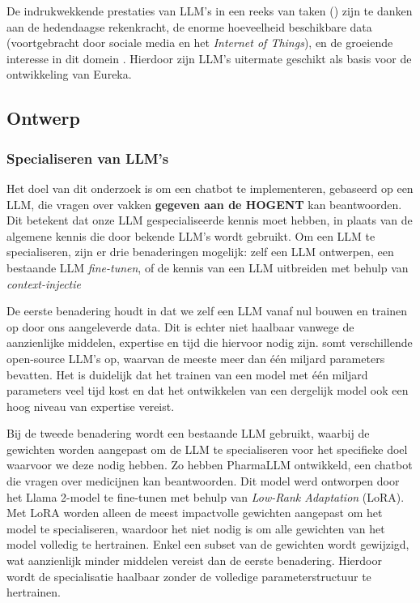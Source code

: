 De indrukwekkende prestaties van LLM's in een reeks van taken (\autocite{Naveed2023}) zijn te danken aan de hedendaagse rekenkracht, de e\-nor\-me hoeveelheid beschikbare data (voortgebracht door sociale media en het \textit{Internet of Things}), en de groeiende interesse in dit domein \autocite{Zohuri2022, Naveed2023}. Hierdoor zijn LLM's uitermate geschikt als basis voor de ontwikkeling van Eureka. 

\subsection{Ontwerp}

\subsubsection{Specialiseren van LLM's}

Het doel van dit onderzoek is om een chatbot te implementeren, gebaseerd op een LLM, die vragen over vakken \textbf{gegeven aan de HOGENT} kan beantwoorden. Dit betekent dat onze LLM gespecialiseerde kennis moet hebben, in plaats van de algemene kennis die door bekende LLM's wordt gebruikt. Om een LLM te specialiseren, zijn er drie benaderingen mogelijk: zelf een LLM ontwerpen, een bestaande LLM \textit{fine-tunen}, of de kennis van een LLM uitbreiden met behulp van \textit{context-injectie}

De eerste benadering houdt in dat we zelf een LLM vanaf nul bouwen en trainen op door ons aangeleverde data. Dit is echter niet haalbaar vanwege de aanzienlijke middelen, expertise \autocite{Naveed2023} en tijd die hiervoor nodig zijn. \textcite{Fourrier2024} somt verschillende open-source LLM's op, waarvan de meeste meer dan één miljard parameters bevatten. Het is duidelijk dat het trainen van een model met één miljard parameters veel tijd kost en dat het ontwikkelen van een dergelijk model ook een hoog niveau van expertise vereist.

Bij de tweede benadering wordt een bestaande LLM gebruikt, waarbij de gewichten worden aangepast om de LLM te specialiseren voor het specifieke doel waarvoor we deze nodig hebben. Zo hebben \textcite{Azam2024} PharmaLLM ontwikkeld, een chatbot die vragen over medicijnen kan beantwoorden. Dit model werd ontworpen door het Llama 2-model te fine-tunen met behulp van \textit{Low-Rank Adaptation} (LoRA). Met LoRA worden alleen de meest impactvolle gewichten aangepast om het model te specialiseren, waardoor het niet nodig is om alle gewichten van het model volledig te hertrainen. Enkel een subset van de gewichten wordt gewijzigd, wat aanzienlijk minder middelen vereist dan de eerste benadering. Hierdoor wordt de specialisatie haalbaar zonder de volledige parameterstructuur te hertrainen.

